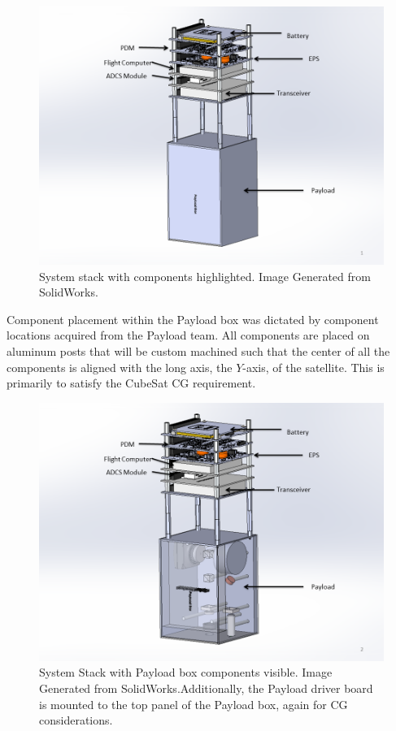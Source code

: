 \documentclass[12pt]{article}
\begin{document}
\begin{figure}[!ht]
\centering
\includegraphics[width=6in]{images/STR-8.png}
\caption{System stack with components highlighted. Image Generated from SolidWorks.}
\label{fig:str-8}
\end{figure}

Component placement within the Payload box was dictated by component locations acquired from the Payload team. All components are placed on aluminum posts that will be custom machined such that the center of all the components is aligned with the long axis, the $Y$-axis, of the satellite. This is primarily to satisfy the CubeSat CG requirement.

\begin{figure}[!ht]
\centering
\includegraphics[width=6in]{images/STR-9.png}
\caption{System Stack with Payload box components visible. Image Generated from SolidWorks.Additionally, the Payload driver board is mounted to the top panel of the Payload box, again for CG considerations.}
\label{fig:str-9}
\end{figure}
\end{document}
